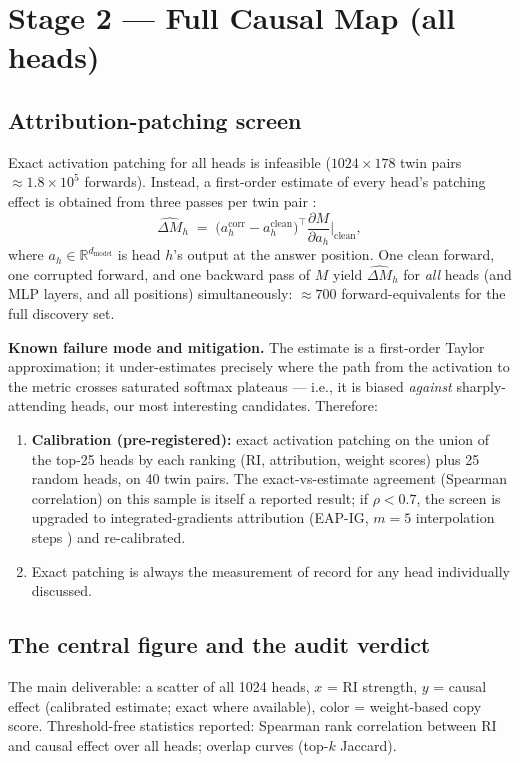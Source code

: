 \documentclass[11pt,a4paper]{article}
\begin{document}
\section{Stage 2 --- Full Causal Map (all heads)}
\subsection{Attribution-patching screen}
Exact activation patching for all heads is infeasible ($1024 \times 178$ twin pairs $\approx 1.8\times10^5$ forwards). Instead, a first-order estimate of every head's patching effect is obtained from three passes per twin pair \cite{attrpatch}:
\begin{equation}
\widehat{\Delta M}_h \;=\; \big(a_h^{\text{corr}} - a_h^{\text{clean}}\big)^{\!\top} \frac{\partial M}{\partial a_h}\bigg|_{\text{clean}},
\end{equation}
where $a_h \in \mathbb{R}^{d_{\text{model}}}$ is head $h$'s output at the answer position. One clean forward, one corrupted forward, and one backward pass of $M$ yield $\widehat{\Delta M}_h$ for \emph{all} heads (and MLP layers, and all positions) simultaneously: $\approx 700$ forward-equivalents for the full discovery set.

\textbf{Known failure mode and mitigation.} The estimate is a first-order Taylor approximation; it under-estimates precisely where the path from the activation to the metric crosses saturated softmax plateaus --- i.e., it is biased \emph{against} sharply-attending heads, our most interesting candidates. Therefore:
\begin{enumerate}[itemsep=1pt]
\item \textbf{Calibration (pre-registered):} exact activation patching on the union of the top-25 heads by each ranking (RI, attribution, weight scores) plus 25 random heads, on 40 twin pairs. The exact-vs-estimate agreement (Spearman correlation) on this sample is itself a reported result; if $\rho < 0.7$, the screen is upgraded to integrated-gradients attribution (EAP-IG, $m{=}5$ interpolation steps \cite{eapig}) and re-calibrated.
\item Exact patching is always the measurement of record for any head individually discussed.
\end{enumerate}

\subsection{The central figure and the audit verdict}
The main deliverable: a scatter of all 1024 heads, $x$ = RI strength, $y$ = causal effect (calibrated estimate; exact where available), color = weight-based copy score. Threshold-free statistics reported: Spearman rank correlation between RI and causal effect over all heads; overlap curves (top-$k$ Jaccard).
\end{document}

